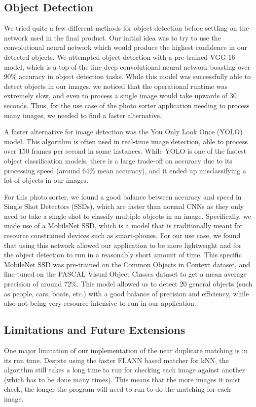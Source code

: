 \documentclass[12pt]{article}
\begin{document}
	
\subsection{Object Detection}
	We tried quite a few different methods for object detection before settling on the network used in the final product. Our initial idea was to try to use the convolutional neural network which would produce the highest confidence in our detected objects. We attempted object detection with a pre-trained VGG-16 model, which is a top of the line deep convolutional neural network boasting over 90\% accuracy in object detection tasks. While this model was successfully able to detect objects in our images, we noticed that the operational runtime was extremely slow, and even to process a single image would take upwards of 30 seconds. Thus, for the use case of the photo sorter application needing to process many images, we needed to find a faster alternative.
	
	A faster alternative for image detection was the You Only Look Once (YOLO) model. This algorithm is often used in real-time image detection, able to process over 150 frames per second in some instances. While YOLO is one of the fastest object classification models, there is a large trade-off on accuracy due to its processing speed (around 64\% mean accuracy), and it ended up misclassifying a lot of objects in our images.
	
	For this photo sorter, we found a good balance between accuracy and speed in Single Shot Detectors (SSDs), which are faster than normal CNNs as they only need to take a single shot to classify multiple objects in an image. Specifically, we made use of a MobileNet SSD, which is a model that is traditionally meant for resource constrained devices such as smart-phones. For our use case, we found that using this network allowed our application to be more lightweight and for the object detection to run in a reasonably short amount of time. This specific MobileNet SSD was pre-trained on the Common Objects in Context dataset, and fine-tuned on the PASCAL Visual Object Classes dataset to get a mean average precision of around 72\%. This model allowed us to detect 20 general objects (such as people, cars, boats, etc.) with a good balance of precision and efficiency, while also not being very resource intensive to run in our application.
	

\subsection{Limitations and Future Extensions}
	One major limitation of our implementation of the near duplicate matching is in its run time. Despite using the faster FLANN based matcher for kNN, the algorithm still takes a long time to run for checking each image against another (which has to be done many times). This means that the more images it must check, the longer the program will need to run to do the matching for each image. 
	
\end{document}
